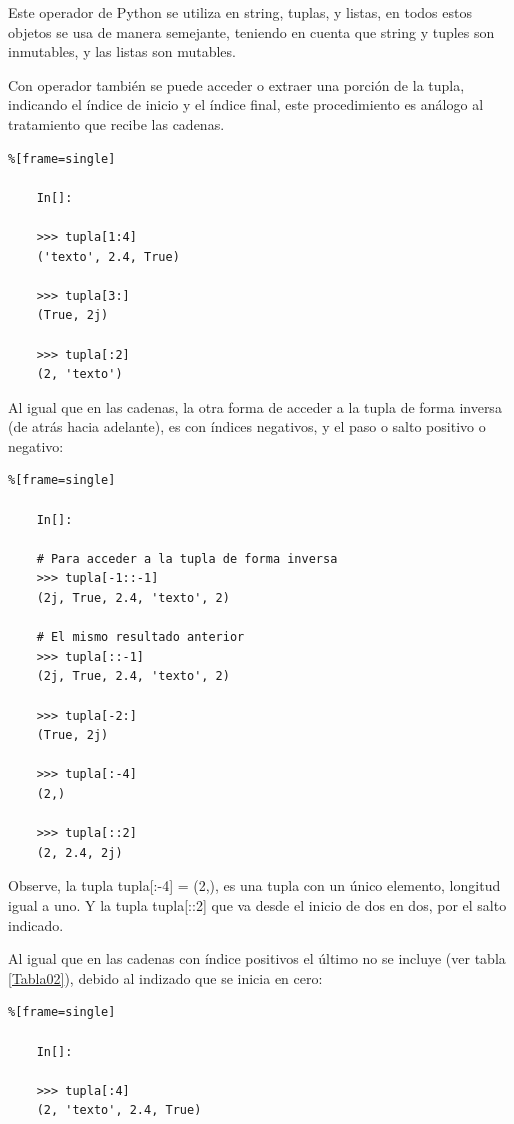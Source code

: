 Este operador {\ttfamily [i]} de Python se utiliza en string, tuplas, y listas, en todos estos objetos se usa de manera semejante, teniendo en cuenta que string y tuples son inmutables, y las listas son mutables. 

Con operador {\ttfamily []}  también se puede acceder o extraer una porción de la tupla, indicando el  índice de inicio y el índice  final, este procedimiento es análogo al tratamiento que recibe las cadenas.

\begin{lstlisting}%[frame=single]
	
	In[]:
	
	>>> tupla[1:4]
	('texto', 2.4, True)
	
	>>> tupla[3:]
	(True, 2j)
	
	>>> tupla[:2]
	(2, 'texto')	
\end{lstlisting}

Al igual que en  las cadenas, la otra forma de acceder a la tupla de forma inversa (de atrás hacia adelante), es con índices negativos, y el paso o salto positivo o negativo:

\begin{lstlisting}%[frame=single]
	
	In[]:
	
	# Para acceder a la tupla de forma inversa	
	>>> tupla[-1::-1]
	(2j, True, 2.4, 'texto', 2)
	
	# El mismo resultado anterior
	>>> tupla[::-1]
	(2j, True, 2.4, 'texto', 2)	
	
	>>> tupla[-2:]
	(True, 2j)
	
	>>> tupla[:-4]
	(2,)
	
	>>> tupla[::2]	
	(2, 2.4, 2j)
\end{lstlisting}

Observe, la tupla {\ttfamily  tupla[:-4] = (2,)}, es una tupla con un único elemento, longitud igual a uno.
Y la tupla {\ttfamily tupla[::2] } que va desde el inicio de dos en dos, por el salto indicado.


Al igual que en las cadenas con índice positivos el último no se incluye (ver tabla \ref{Tabla02}), debido al indizado que se  inicia en cero:
\begin{lstlisting}%[frame=single]
	
	In[]:
	
	>>> tupla[:4]
	(2, 'texto', 2.4, True)
\end{lstlisting}





